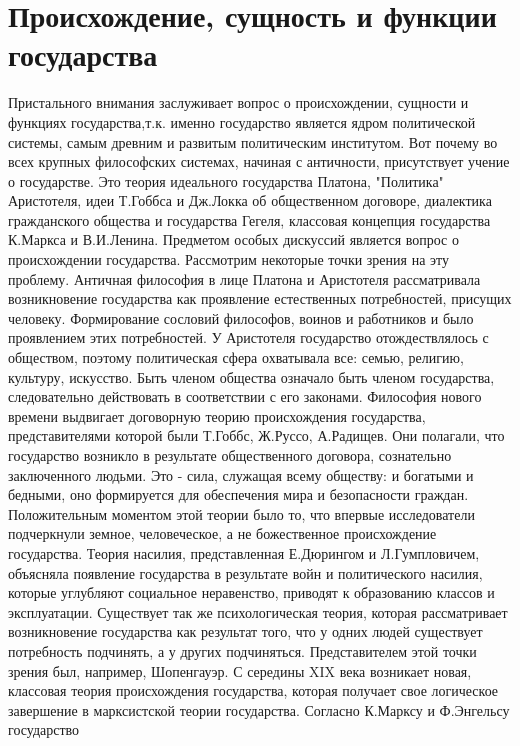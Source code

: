 \documentclass[12pt]{article}
\begin{document}
\section{Происхождение, сущность и функции государства}
Пристального внимания заслуживает вопрос о происхождении, сущности и функциях государства,т.к. именно
государство является ядром политической системы, самым древним и развитым политическим институтом. Вот
почему во всех крупных философских системах, начиная с античности, присутствует учение о государстве. Это
теория идеального государства Платона, "Политика" Аристотеля, идеи Т.Гоббса и Дж.Локка об общественном
договоре, диалектика гражданского общества и государства Гегеля, классовая концепция государства К.Маркса
и В.И.Ленина.
Предметом особых дискуссий является вопрос о происхождении государства. Рассмотрим некоторые точки
зрения на эту проблему. Античная философия в лице Платона и Аристотеля рассматривала возникновение
государства  как  проявление  естественных  потребностей,  присущих  человеку.  Формирование  сословий
философов,  воинов  и  работников  и  было  проявлением  этих  потребностей.  У  Аристотеля  государство
отождествлялось  с  обществом,  поэтому  политическая  сфера  охватывала  все:  семью,  религию,  культуру,
искусство. Быть членом общества означало быть членом государства, следовательно действовать в соответствии
с  его  законами.  Философия  нового  времени  выдвигает  договорную  теорию  происхождения  государства,
представителями  которой  были  Т.Гоббс,  Ж.Руссо,  А.Радищев.  Они  полагали,  что  государство  возникло  в
результате общественного договора, сознательно заключенного людьми. Это - сила, служащая всему обществу:
и богатыми и бедными, оно формируется для обеспечения мира и безопасности граждан. Положительным
моментом  этой  теории  было  то,  что  впервые  исследователи  подчеркнули  земное,  человеческое,  а  не
божественное происхождение государства.
Теория насилия, представленная Е.Дюрингом и Л.Гумпловичем, объясняла появление государства в результате
войн и политического насилия, которые углубляют социальное неравенство, приводят к образованию классов и
эксплуатации.
Существует так же психологическая теория, которая рассматривает возникновение государства как результат
того, что у одних людей существует потребность подчинять, а у других подчиняться. Представителем этой
точки зрения был, например, Шопенгауэр.
С середины XIX века возникает новая, классовая теория происхождения государства, которая получает свое
логическое  завершение  в  марксистской  теории  государства.  Согласно  К.Марксу  и  Ф.Энгельсу  государство
\end{document}
